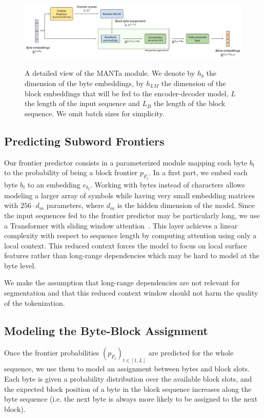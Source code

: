 \begin{figure}[!t]
    \centering\label{fig:detailled_diagram}
    \includegraphics[width=0.9\linewidth]{sources/part_2/manta/images/MANTa_Tokenization_Module.pdf}
    \caption{A detailed view of the MANTa module. We denote by $h_b$ the dimension of the byte embeddings, by $h_{LM}$ the dimension of the block embeddings that will be fed to the encoder-decoder model, $L$ the length of the input sequence and $L_B$ the length of the block sequence. We omit batch sizes for simplicity.}
\end{figure}

\subsection{Predicting Subword Frontiers}
\label{sec:frontpred}
Our frontier predictor consists in a parameterized module mapping each byte $b_t$ to the probability of being a block frontier $p_{F_t}$. In a first part, we embed each byte $b_t$ to an embedding $e_{b_t}$. Working with bytes instead of characters allows modeling a larger array of symbols while having very small embedding matrices with $256\cdot d_m$ parameters, where $d_m$ is the hidden dimension of the model. Since the input sequences fed to the frontier predictor may be particularly long, we use a Transformer with sliding window attention~\citep{beltagy2020longformer}. This layer achieves a linear complexity with respect to sequence length by computing attention using only a local context. This reduced context forces the model to focus on local surface features rather than long-range dependencies which may be hard to model at the byte level.

We make the assumption that long-range dependencies are not relevant for segmentation and that this reduced context window should not harm the quality of the tokenization.


\subsection{Modeling the Byte-Block Assignment}
Once the frontier probabilities $(p_{F_t})_{t \in [1, L]}$ are predicted for the whole sequence, we use them to model an assignment between bytes and block slots. Each byte is given a probability distribution over the available block slots, and the expected block position of a byte in the block sequence increases along the byte sequence (i.e. the next byte is always more likely to be assigned to the next block).

